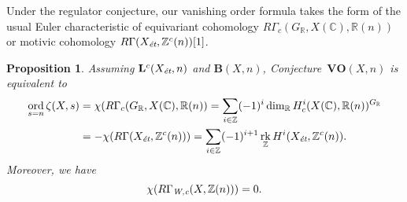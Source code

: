 \documentclass[10pt,a4paper,oneside]{article}
\DeclareMathOperator{\ord}{ord}
\DeclareMathOperator{\rk}{rk}
\newcommand{\CC}{\mathbb{C}}
\newcommand{\RR}{\mathbb{R}}
\newcommand{\ZZ}{\mathbb{Z}}
\newcommand{\et}{\text{\it \'{e}t}}
\newcommand{\Wc}{\text{\it W,c}}
\theoremstyle{myplain}
\newtheorem{proposition}[theorem]{Proposition}
\theoremstyle{mydefinition}
\numberwithin{equation}{section}
\begin{document}
Under the regulator conjecture, our vanishing order formula takes the form of
the usual Euler characteristic of equivariant cohomology
$R\Gamma_c (G_\RR, X(\CC), \RR (n))$ or motivic cohomology
$R\Gamma (X_\et, \ZZ^c (n)) [1]$.

\begin{proposition}
  \label{prop:VO(X,n)-assuming-B(X,n)}
  Assuming $\mathbf{L}^c (X_\et, n)$ and $\mathbf{B} (X,n)$,
  Conjecture~$\mathbf{VO} (X,n)$ is equivalent to
  \begin{align*}
    \ord_{s=n} \zeta (X,s) & = \chi (R\Gamma_c (G_\RR, X(\CC), \RR (n))
    = \sum_{i \in \ZZ} (-1)^i \dim_\RR H^i_c (X(\CC), \RR (n))^{G_\RR} \\
                           & = -\chi (R\Gamma (X_\et, \ZZ^c (n)))
    = \sum_{i \in \ZZ} (-1)^{i+1} \rk_\ZZ H^i (X_\et, \ZZ^c (n)).
  \end{align*}
  Moreover, we have
  $$\chi (R\Gamma_\Wc (X, \ZZ(n))) = 0.$$


\end{proposition}
\end{document}

